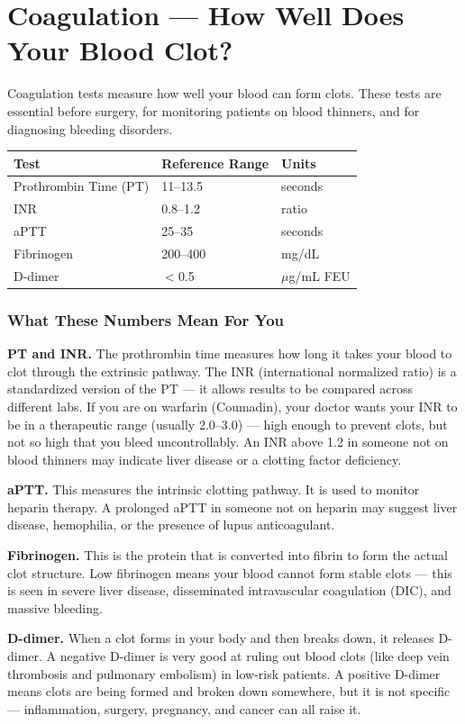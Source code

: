 \clearpage
\section{Coagulation --- How Well Does Your Blood Clot?}

Coagulation tests measure how well your blood can form clots. These tests are essential before surgery, for monitoring patients on blood thinners, and for diagnosing bleeding disorders.

\begin{longtable}{@{}lll@{}}
\toprule
\textbf{Test} & \textbf{Reference Range} & \textbf{Units} \\
\midrule
Prothrombin Time (PT) & 11--13.5 & seconds \\
INR & 0.8--1.2 & ratio \\
aPTT & 25--35 & seconds \\
Fibrinogen & 200--400 & mg/dL \\
D-dimer & $<$0.5 & $\mu$g/mL FEU \\
\bottomrule
\end{longtable}

\subsubsection{What These Numbers Mean For You}

\textbf{PT and INR.} The prothrombin time measures how long it takes your blood to clot through the extrinsic pathway. The INR (international normalized ratio) is a standardized version of the PT --- it allows results to be compared across different labs. If you are on warfarin (Coumadin), your doctor wants your INR to be in a therapeutic range (usually 2.0--3.0) --- high enough to prevent clots, but not so high that you bleed uncontrollably. An INR above 1.2 in someone not on blood thinners may indicate liver disease or a clotting factor deficiency.

\textbf{aPTT.} This measures the intrinsic clotting pathway. It is used to monitor heparin therapy. A prolonged aPTT in someone not on heparin may suggest liver disease, hemophilia, or the presence of lupus anticoagulant.

\textbf{Fibrinogen.} This is the protein that is converted into fibrin to form the actual clot structure. Low fibrinogen means your blood cannot form stable clots --- this is seen in severe liver disease, disseminated intravascular coagulation (DIC), and massive bleeding.

\textbf{D-dimer.} When a clot forms in your body and then breaks down, it releases D-dimer. A negative D-dimer is very good at ruling out blood clots (like deep vein thrombosis and pulmonary embolism) in low-risk patients. A positive D-dimer means clots are being formed and broken down somewhere, but it is not specific --- inflammation, surgery, pregnancy, and cancer can all raise it.

